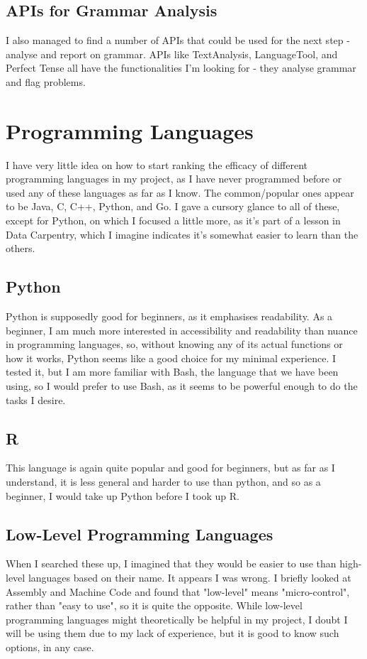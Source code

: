 \documentclass{article}
\begin{document}
\subsection{APIs for Grammar Analysis}
I also managed to find a number of APIs that could be used for the next step - analyse and report on grammar. APIs like TextAnalysis, LanguageTool, and Perfect Tense all have the functionalities I'm looking for - they analyse grammar and flag problems.

\section{Programming Languages}
I have very little idea on how to start ranking the efficacy of different programming languages in my project, as I have never programmed before or used any of these languages as far as I know. The common/popular ones appear to be Java, C, C++, Python, and Go. I gave a cursory glance to all of these, except for Python, on which I focused a little more, as it's part of a lesson in Data Carpentry, which I imagine indicates it's somewhat easier to learn than the others.

\subsection{Python}
Python is supposedly good for beginners, as it emphasises readability. As a beginner, I am much more interested in accessibility and readability than nuance in programming languages, so, without knowing any of its actual functions or how it works, Python seems like a good choice for my minimal experience. I tested it, but I am more familiar with Bash, the language that we have been using, so I would prefer to use Bash, as it seems to be powerful enough to do the tasks I desire.

\subsection{R}
This language is again quite popular and good for beginners, but as far as I understand, it is less general and harder to use than python, and so as a beginner, I would take up Python before I took up R.

\subsection{Low-Level Programming Languages}
When I searched these up, I imagined that they would be easier to use than high-level languages based on their name. It appears I was wrong. I briefly looked at Assembly and Machine Code and found that "low-level" means "micro-control", rather than "easy to use", so it is quite the opposite. While low-level programming languages might theoretically be helpful in my project, I doubt I will be using them due to my lack of experience, but it is good to know such options, in any case.
\end{document}

